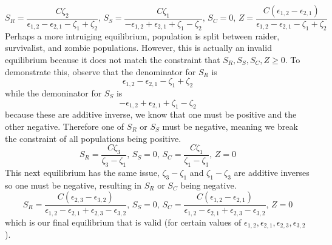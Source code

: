 \documentclass{article}
\begin{document}
\[
    S_R = \frac{C \zeta_2}{\epsilon_{1,2} - \epsilon_{2,1} - \zeta_1 + \zeta_2},\,
    S_S = \frac{C \zeta_1}{-\epsilon_{1,2} + \epsilon_{2,1} + \zeta_1 - \zeta_2},\,
    S_C = 0,\,
    Z = \frac{C (\epsilon_{1,2} - \epsilon_{2,1})}{\epsilon_{1,2} - \epsilon_{2,1} - \zeta_1 + \zeta_2}
\]
Perhaps a more intruiging equilibrium, population is split between raider, survivalist, and zombie populations. However, this is actually an invalid equilibrium because it does not match the constraint that $S_R, S_S, S_C, Z \geq 0$. To demonstrate this, observe that the denominator for $S_R$ is
\[
    \epsilon_{1,2} - \epsilon_{2,1} - \zeta_1 + \zeta_2
\]
while the demoninator for $S_S$ is
\[
    -\epsilon_{1,2} + \epsilon_{2,1} + \zeta_1 - \zeta_2
\]
because these are additive inverse, we know that one must be positive and the other negative. Therefore one of $S_R$ or $S_S$ must be negative, meaning we break the constraint of all populations being positive.
\[
    S_R = \frac{C \zeta_3}{\zeta_3 - \zeta_1},\,
    S_S = 0,\,
    S_C = \frac{C \zeta_1}{\zeta_1 - \zeta_3},\,
    Z = 0
\]
This next equilibrium has the same issue, $\zeta_3 - \zeta_1$ and $\zeta_1 - \zeta_3$ are additive inverses so one must be negative, resulting in $S_R$ or $S_C$ being negative.
\[
    S_R = \frac{C (\epsilon_{2,3} - \epsilon_{3,2})}{\epsilon_{1,2} - \epsilon_{2,1} + \epsilon_{2,3} - \epsilon_{3,2}},\,
    S_S = 0,\,
    S_C = \frac{C (\epsilon_{1,2} - \epsilon_{2,1})}{\epsilon_{1,2} - \epsilon_{2,1} + \epsilon_{2,3} - \epsilon_{3,2}},\,
    Z = 0
\]
which is our final equilibrium that is valid (for certain values of $\epsilon_{1,2}, \epsilon_{2, 1}, \epsilon_{2, 3}, \epsilon_{3, 2}$). 
\end{document}
